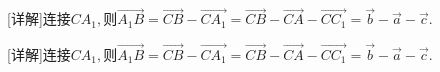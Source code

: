 \documentclass[fontset=none]{ctexart}
\begin{document}
\noindent\begin{minipage}[t]{49.400mm}\raggedright [详解]连接\(CA_{1},\)则\nobreak\(\overrightarrow{A_{1}B} = \overrightarrow{CB} - \overrightarrow{CA_{1}} = \overrightarrow{CB} - \overrightarrow{CA} - \overrightarrow{CC_{1}} =\overrightarrow{b} - \overrightarrow{a} - \overrightarrow{c}\).\end{minipage}\par\newpage
\noindent\begin{minipage}[t]{49.500mm}\raggedright [详解]连接\(CA_{1},\)则\nobreak\(\overrightarrow{A_{1}B} = \overrightarrow{CB} - \overrightarrow{CA_{1}} = \overrightarrow{CB} - \overrightarrow{CA} - \overrightarrow{CC_{1}} =\overrightarrow{b} - \overrightarrow{a} - \overrightarrow{c}\).\end{minipage}\par\newpage
\end{document}
